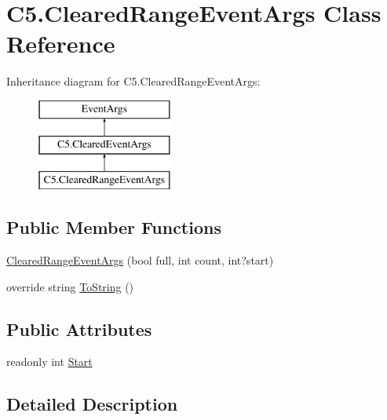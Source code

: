 \hypertarget{class_c5_1_1_cleared_range_event_args}{}\section{C5.\+Cleared\+Range\+Event\+Args Class Reference}
\label{class_c5_1_1_cleared_range_event_args}


 


Inheritance diagram for C5.\+Cleared\+Range\+Event\+Args\+:\begin{figure}[H]
\begin{center}
\leavevmode
\includegraphics[height=3.000000cm]{class_c5_1_1_cleared_range_event_args}
\end{center}
\end{figure}
\subsection*{Public Member Functions}
\begin{DoxyCompactItemize}
\item 
\hyperlink{class_c5_1_1_cleared_range_event_args_ae8aeea017aa864f10471e070837dc908}{Cleared\+Range\+Event\+Args} (bool full, int count, int?start)
\item 
override string \hyperlink{class_c5_1_1_cleared_range_event_args_a1460b4c9431d78360945e1ce4d64864d}{To\+String} ()
\end{DoxyCompactItemize}
\subsection*{Public Attributes}
\begin{DoxyCompactItemize}
\item 
readonly int \hyperlink{class_c5_1_1_cleared_range_event_args_aa6c242b23ec6a07c3442a6c5b0cafd98}{Start}
\end{DoxyCompactItemize}


\subsection{Detailed Description}




